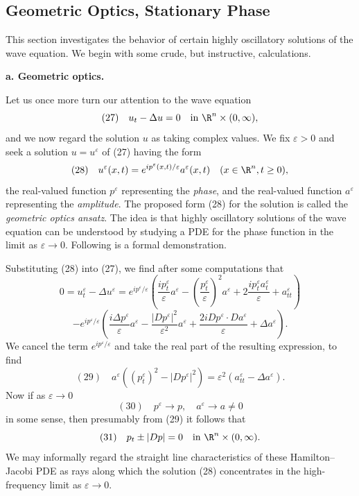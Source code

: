 \subsection{Geometric Optics, Stationary Phase}
\label{sec:geometric-optics-stationary-phase}

This section investigates the behavior of certain highly oscillatory solutions of the wave equation. We begin with some crude, but instructive, calculations.

\textbf{a. Geometric optics.}

\begin{example}
\label{ex:geometric-optics-oscillating-solutions}
Let us once more turn our attention to the wave equation
$$(27) \quad u_t - \Delta u = 0 \quad \text{in } \R^n \times (0,\infty),$$
and we now regard the solution $u$ as taking complex values. We fix $\varepsilon > 0$ and seek a solution $u = u^\varepsilon$ of (27) having the form
$$(28) \quad u^\varepsilon(x,t) = e^{ip^\varepsilon(x,t)/\varepsilon} a^\varepsilon(x,t) \quad (x \in \R^n, t \geq 0),$$
the real-valued function $p^\varepsilon$ representing the \textit{phase}, and the real-valued function $a^\varepsilon$ representing the \textit{amplitude}. The proposed form (28) for the solution is called the \textit{geometric optics ansatz}. The idea is that highly oscillatory solutions of the wave equation can be understood by studying a PDE for the phase function in the limit as $\varepsilon \to 0$. Following is a formal demonstration.

Substituting (28) into (27), we find after some computations that
$$0 = u_t^\varepsilon - \Delta u^\varepsilon = e^{ip^\varepsilon/\varepsilon} \left( \frac{ip_t^\varepsilon}{\varepsilon} a^\varepsilon - \left(\frac{p_t^\varepsilon}{\varepsilon}\right)^2 a^\varepsilon + 2\frac{ip_t^\varepsilon a_t^\varepsilon}{\varepsilon} + a_{tt}^\varepsilon \right)$$
$$- e^{ip^\varepsilon/\varepsilon} \left( \frac{i\Delta p^\varepsilon}{\varepsilon} a^\varepsilon - \frac{|Dp^\varepsilon|^2}{\varepsilon^2} a^\varepsilon + \frac{2i Dp^\varepsilon \cdot Da^\varepsilon}{\varepsilon} + \Delta a^\varepsilon \right).$$
We cancel the term $e^{ip^\varepsilon/\varepsilon}$ and take the real part of the resulting expression, to find
$$(29) \quad a^\varepsilon((p_t^\varepsilon)^2 - |Dp^\varepsilon|^2) = \varepsilon^2(a_{tt}^\varepsilon - \Delta a^\varepsilon).$$
Now if as $\varepsilon \to 0$
$$(30) \quad p^\varepsilon \to p, \quad a^\varepsilon \to a \neq 0$$
in some sense, then presumably from (29) it follows that
$$(31) \quad p_t \pm |Dp| = 0 \quad \text{in } \R^n \times (0,\infty).$$
We may informally regard the straight line characteristics of these Hamilton--Jacobi PDE as rays along which the solution (28) concentrates in the high-frequency limit as $\varepsilon \to 0$.


\end{example}
